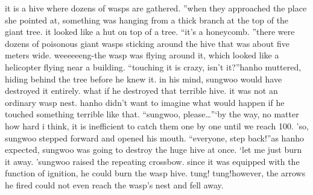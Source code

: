  it is a hive where dozens of wasps are gathered.
”when they approached the place she pointed at, something was hanging from a thick branch at the top of the giant tree.
 it looked like a hut on top of a tree.
“it’s a honeycomb.
”there were dozens of poisonous giant wasps sticking around the hive that was about five meters wide.
weeeeeeng-the wasp was flying around it, which looked like a helicopter flying near a building.
“touching it is crazy, isn’t it?”hanho muttered, hiding behind the tree before he knew it.
in his mind, sungwoo would have destroyed it entirely.
what if he destroyed that terrible hive.
 it was not an ordinary wasp nest.
hanho didn’t want to imagine what would happen if he touched something terrible like that.
“sungwoo, please…”‘by the way, no matter how hard i think, it is inefficient to catch them one by one until we reach 100.
’so, sungwoo stepped forward and opened his mouth.
“everyone, step back!”as hanho expected, sungwoo was going to destroy the huge hive at once.
‘let me just burn it away.
’sungwoo raised the repeating crossbow.
 since it was equipped with the function of ignition, he could burn the wasp hive.
tung! tung!however, the arrows he fired could not even reach the wasp’s nest and fell away.


